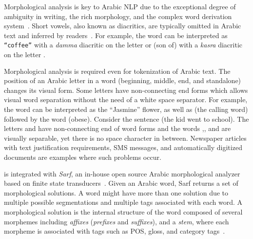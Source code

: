 \vocalize

\def\pp{\ensuremath{{\cal P}}} %
\def\ss{\ensuremath{{\cal S}}} %
\def\xx{\ensuremath{{\cal X}}} %
\def\PP{\ensuremath{\mathit{POS}}} %
\def\GG{\ensuremath{\mathit{GLOSS}}} %
\def\AC{\ensuremath{\mathit{CAT}}} %

Morphological analysis is key to Arabic 
NLP
due to the exceptional degree of ambiguity in writing, 
the rich morphology, and the complex word derivation 
system~\cite{arabicmorph,shahrour2016camelparser,pasha2014madamira}.
Short vowels, also known as diacritics, are typically omitted in Arabic text
and inferred by readers~\cite{habash2006arabic}. 
For example, the word %
can be interpreted as  {\tt ``coffee''} with a {\em damma} diacritic on the 
letter  or 
\vocalize {} (son of) with a 
{\em kasra} diacritic on the letter .

Morphological analysis is required even for tokenization of Arabic text. 
The position of an Arabic letter in a word 
(beginning, middle, end, and standalone) changes
its visual form.
Some letters have non-connecting end forms which allows visual
word separation without the need of a white space separator. 
For example, the word  can be interpreted as
the ``Jasmine'' flower, 
as well as  (the calling word) followed by
the word  (obese). 
Consider the sentence 
\arabfalse {} \arabtrue
(the kid went to school). 
The letters  and  have 
non-connecting end of word forms and the words 
,, and 
are visually separable, 
yet there is no space character in between.
Newspaper articles with text justification requirements, 
SMS messages, and automatically digitized documents
are examples where such problems occur. 

\framework is integrated with {\em Sarf}, 
an in-house open source Arabic morphological analyzer based on 
finite state transducers~\cite{ZaMaColing2012DemosSarf}. 
Given an Arabic word, Sarf returns 
a set of morphological solutions. 
A word might have more than one solution 
due to multiple possible segmentations and multiple tags associated 
with each word. 
A morphological solution is the internal structure of the word 
composed of several morphemes including 
{\em affixes} ({\em prefixes} and {\em suffixes}), and a
{\em stem}, where each morpheme is associated with tags such as 
POS, gloss, and category tags~\cite{arabicmorph,habash2010introduction}.

